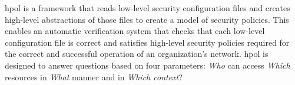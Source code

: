 \documentclass[12pt,letterpaper]{report}
\begin{document}
\ac{hpol} is a framework that reads low-level security configuration files and creates high-level abstractions of those files to create a model of security policies. This enables an automatic verification system that checks that each low-level configuration file is correct and satisfies high-level security policies required for the correct and successful operation of an organization's network. \ac{hpol} is designed to answer questions based on four parameters: \textit{Who} can access \textit{Which} resources in \textit{What} manner and in \textit{Which context}?








\end{document}

